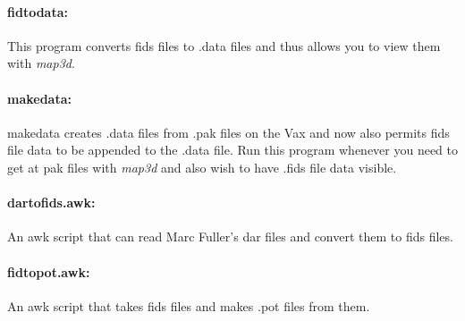 \documentclass[11pt]{article}
\begin{document}
\paragraph{fidtodata:  } This program converts fids files to .data files
and thus allows you to view them with {\em map3d}.

\paragraph{makedata: } makedata creates .data files from .pak files on the
Vax and now also permits fids file data to be appended to the .data file.
Run this program whenever you need to get at pak files with {\em map3d\/}
and also wish to have .fids file data visible.

\paragraph{dartofids.awk: } An awk script that can read Marc Fuller's dar
files and convert them to fids files.

\paragraph{fidtopot.awk: } An awk script that takes fids files and makes
.pot files from them.
\end{document}
